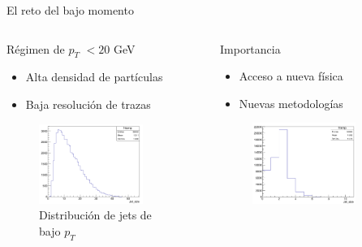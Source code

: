 \documentclass[aspectratio=43]{beamer}
\begin{document}
\begin{frame}{El reto del bajo momento}
  \begin{columns}
    \begin{column}{0.49\textwidth}
      \begin{block}{Régimen de \texorpdfstring{$p_T$}{pT} $<20$ GeV}
        \begin{itemize}
          \item Alta densidad de partículas
          \item Baja resolución de trazas
        \end{itemize}
      \end{block}
      \vspace{-0.3em}
      \begin{figure}
        \includegraphics[width=0.79\textwidth]{njetl.png}
        \caption{\small Distribución de jets de bajo \texorpdfstring{$p_T$}{pT}}
      \end{figure}
    \end{column}
    \begin{column}{0.49\textwidth}
      \begin{block}{Importancia}
        \begin{itemize}
          \item Acceso a nueva física
          \item Nuevas metodologías
        \end{itemize}
      \end{block}
      \vspace{-0.005em}
      \begin{figure}
        \includegraphics[width=0.79\textwidth]{njeth.png}

\end{figure}
\end{column}
\end{columns}
\end{frame}
\end{document}
